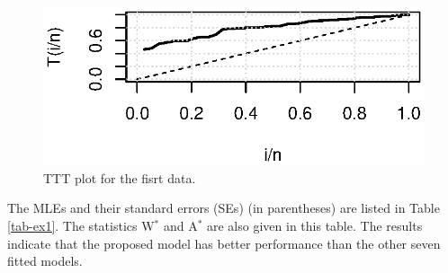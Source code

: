 \documentclass[twoside,leqno,11pt]{article}
\begin{document}
\begin{figure}[H]
\begin{center}
\includegraphics[scale =  1]{ttt1.eps}
\caption{TTT plot for the fisrt data.\label{ttt}}
\end{center}
\end{figure}


The MLEs and their standard errors (SEs) (in parentheses) are listed in Table \ref{tab-ex1}.
The statistics  W$^{*}$ and A$^{*}$ are also given in this table. The results indicate that the proposed model has better performance than the other
seven fitted models.
\end{document}
